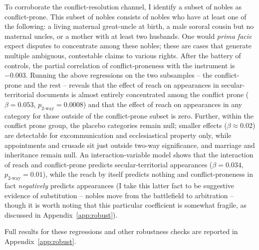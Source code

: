 \documentclass[12pt]{article}
\theoremstyle{definition}
\theoremstyle{remark}
\begin{document}
To corroborate the conflict-resolution channel, I identify a subset of nobles as conflict-prone. This subset of nobles consists of nobles who have at least one of the following: a living maternal great-uncle at birth, a male sororal cousin but no maternal uncles, or a mother with at least two husbands. One would \textit{prima facie} expect disputes to concentrate among these nobles; these are cases that generate multiple ambiguous, contestable claims to various rights. After the battery of controls, the partial correlation of conflict-proneness with the instrument is $-0.003$. Running the above regressions on the two subsamples -- the conflict-prone and the rest -- reveals that the effect of reach on appearances in secular-territorial documents is almost entirely concentrated among the conflict prone ($\beta = 0.053$, $p_{\text{2-way}} = 0.0008$) and that the effect of reach on appearances in any category for those outside of the conflict-prone subset is zero. Further, within the conflict prone group, the placebo categories remain null; smaller effects ($\beta \approx 0.02$) are detectable for excommunication and ecclesiastical property only, while appointments and crusade sit just outside two-way significance, and marriage and inheritance remain null. An interaction-variable model shows that the interaction of reach and conflict-prone predicts secular-territorial appearances ($\beta = 0.034$, $p_{\text{2-way}} = 0.01$), while the reach by itself predicts nothing and conflict-proneness in fact \textit{negatively} predicts appearances (I take this latter fact to be suggestive evidence of substitution -- nobles move from the battlefield to arbitration -- though it is worth noting that this particular coefficient is somewhat fragile, as discussed in Appendix~\ref{app:robust}).

Full results for these regressions and other robustness checks are reported in Appendix~\ref{app:robust}.
\end{document}
